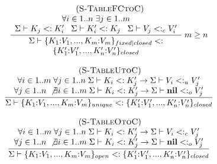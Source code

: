 \documentclass[preprint]{sigplanconf}
\newcommand{\Nil}{\mathbf{nil}}
\newcommand{\mylabel}[1]{\; (\textsc{#1})}
\newcommand{\senv}{\Sigma}
\newcommand{\subtype}{<:}
\begin{document}
\begin{figure}[t]
\label{fig:subtable}
\[
\begin{array}{c}
\begin{array}{c}
\mylabel{S-TableFCtoC}\\
\dfrac{\begin{array}{c}
	\forall i \in 1..n \; \exists j \in 1..m \\
	\senv \vdash K_{j} \subtype K_{i}' \;\;\;
	\senv \vdash K_{i}' \subtype K_{j} \;\;\;
	\senv \vdash V_{j} \subtype_{c} V_{i}'
	\end{array}}
{\begin{array}{c}
	\senv \vdash \{K_{1}{:}V_{1}, ..., K_{m}{:}V_{m}\}_{fixed|closed} \subtype\\
	\{K_{1}'{:}V_{1}', ..., K_{n}'{:}V_{n}'\}_{closed}
	\end{array}} \; m \ge n
\end{array}\\\\
\begin{array}{c}
\mylabel{S-TableUtoC}\\
\dfrac{\begin{array}{c}
	\forall i \in 1..m \; \forall j \in 1..n \;
	\senv \vdash K_{i} \subtype K_{j}' \to \senv \vdash V_{i} \subtype_{u} V_{j}' \\
	\forall j \in 1..n \; \not\exists i \in 1..m \;
	\senv \vdash K_{i} \subtype K_{j}' \to \senv \vdash \Nil \subtype_{o} V_{j}'
	\end{array}}
{\senv \vdash \{K_{1}{:}V_{1}, ..., K_{m}{:}V_{m}\}_{unique} \subtype
	\{K_{1}'{:}V_{1}', ..., K_{n}'{:}V_{n}'\}_{closed}}
\end{array}\\\\
\begin{array}{c}
\mylabel{S-TableOtoC}\\
\dfrac{\begin{array}{c}
	\forall i \in 1..m \; \forall j \in 1..n \;
	\senv \vdash K_{i} \subtype K_{j}' \to \senv \vdash V_{i} \subtype_{c} V_{j}' \\
	\forall j \in 1..n \; \not\exists i \in 1..m \;
	\senv \vdash K_{i} \subtype K_{j}' \to \senv \vdash \Nil \subtype_{o} V_{j}'
	\end{array}}
{\senv \vdash \{K_{1}{:}V_{1}, ..., K_{m}{:}V_{m}\}_{open} \subtype
	\{K_{1}'{:}V_{1}', ..., K_{n}'{:}V_{n}'\}_{closed}}
\end{array}\\\\

\end{array}\]
\end{figure}
\end{document}
